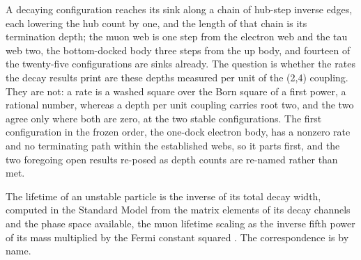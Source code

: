 A decaying configuration reaches its sink along a chain of hub-step inverse edges, each lowering the hub count by one, and the length of that chain is its termination depth; the muon web is one step from the electron web and the tau web two, the bottom-docked body three steps from the up body, and fourteen of the twenty-five configurations are sinks already. The question is whether the rates the decay results print are these depths measured per unit of the (2,4) coupling. They are not: a rate is a washed square over the Born square of a first power, a rational number, whereas a depth per unit coupling carries root two, and the two agree only where both are zero, at the two stable configurations. The first configuration in the frozen order, the one-dock electron body, has a nonzero rate and no terminating path within the established webs, so it parts first, and the two foregoing open results re-posed as depth counts are re-named rather than met.
\begin{chbridge}
The lifetime of an unstable particle is the inverse of its total decay width, computed in the Standard Model from the matrix elements of its decay channels and the phase space available, the muon lifetime scaling as the inverse fifth power of its mass multiplied by the Fermi constant squared \cite{Fermi1934,Peskin1995}. The correspondence is by name.
\end{chbridge}
